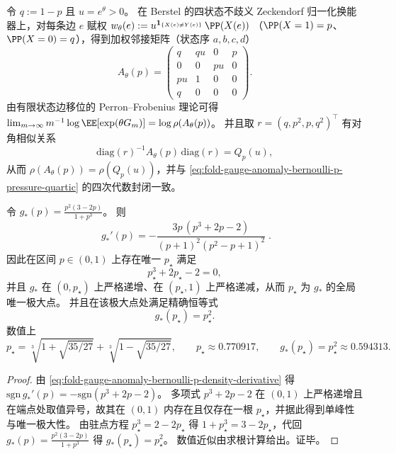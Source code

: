 \begin{remark}\label{rem:fold-gauge-anomaly-bernoulli-p-adjacency-parry}
令 \(q:=1-p\) 且 \(u=e^\theta>0\)。
在 Berstel 的四状态不歧义 Zeckendorf 归一化换能器上，对每条边 \(e\) 赋权
\(
w_\theta(e):=u^{\mathbf 1_{\{X(e)\neq Y(e)\}}}\,\PP(X(e))
\)
（\(\PP(X=1)=p\)、\(\PP(X=0)=q\)），得到加权邻接矩阵（状态序 \(a,b,c,d\)）
\[
A_\theta(p)=
\begin{pmatrix}
q & q u & 0 & p\\
0 & 0 & p u & 0\\
p u & 1 & 0 & 0\\
q & 0 & 0 & 0
\end{pmatrix}.
\]
由有限状态边移位的 Perron--Frobenius 理论可得
\(
\lim_{m\to\infty}m^{-1}\log \EE[\exp(\theta G_m)]=\log\rho(A_\theta(p))
\)。
并且取 \(r=(q,p^2,p,q^2)^{\top}\) 有对角相似关系
\[
\mathrm{diag}(r)^{-1}A_\theta(p)\,\mathrm{diag}(r)=Q_p(u),
\]
从而 \(\rho(A_\theta(p))=\rho(Q_p(u))\)，并与 \eqref{eq:fold-gauge-anomaly-bernoulli-p-pressure-quartic} 的四次代数封闭一致。
\end{remark}
\begin{corollary}[失配密度的单峰性与唯一极大点]\label{cor:fold-gauge-anomaly-bernoulli-p-density-unimodal}
令 \(g_\ast(p)=\frac{p^2(3-2p)}{1+p^3}\)。
则
\begin{equation}\label{eq:fold-gauge-anomaly-bernoulli-p-density-derivative}
\boxed{\;
g_\ast'(p)=
-\frac{3p\,(p^3+2p-2)}{(p+1)^2(p^2-p+1)^2}\; }.
\end{equation}
因此在区间 \(p\in(0,1)\) 上存在唯一 \(p_\star\) 满足
\begin{equation}\label{eq:fold-gauge-anomaly-bernoulli-p-density-maximizer}
p_\star^3+2p_\star-2=0,
\end{equation}
并且 \(g_\ast\) 在 \((0,p_\star)\) 上严格递增、在 \((p_\star,1)\) 上严格递减，从而 \(p_\star\) 为 \(g_\ast\) 的全局唯一极大点。
并且在该极大点处满足精确恒等式
\[
\boxed{\;g_\ast(p_\star)=p_\star^2.\;}
\]
数值上
\[
p_\star=\sqrt[3]{1+\sqrt{35/27}}+\sqrt[3]{1-\sqrt{35/27}},
\qquad
p_\star\approx 0.770917,
\qquad
g_\ast(p_\star)=p_\star^2\approx 0.594313.
\]
\end{corollary}
\begin{proof}
由 \eqref{eq:fold-gauge-anomaly-bernoulli-p-density-derivative} 得
\(\mathrm{sgn}\,g_\ast'(p)=-\mathrm{sgn}(p^3+2p-2)\)。
多项式 \(p^3+2p-2\) 在 \((0,1)\) 上严格递增且在端点处取值异号，故其在 \((0,1)\) 内存在且仅存在一根 \(p_\star\)，并据此得到单峰性与唯一极大性。
由驻点方程 \(p_\star^3=2-2p_\star\) 得 \(1+p_\star^3=3-2p_\star\)，代回 \(g_\ast(p)=\frac{p^2(3-2p)}{1+p^3}\) 得 \(g_\ast(p_\star)=p_\star^2\)。
数值近似由求根计算给出。证毕。
\end{proof}

